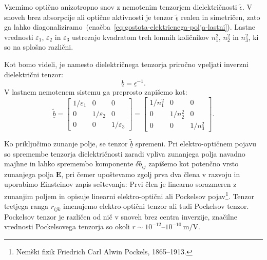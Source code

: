 Vzemimo optično anizotropno snov z nemotenim tenzorjem dielektričnosti  
$\underline{\tilde{\epsilon}}$. V snoveh brez absorpcije ali optične aktivnosti
je tenzor $\underline{\tilde{\epsilon}}$ realen in simetričen, zato ga lahko 
diagonaliziramo~(enačba~\ref{eq:gostota-elektricnega-polja-lastni}). Lastne vrednosti 
$\varepsilon_1$, $\varepsilon_2$ in $\varepsilon_3$ ustrezajo kvadratom treh lomnih
količnikov $n_1^2$, $n_2^2$ in $n_3^2$, ki so na splošno različni.

Kot bomo videli, je namesto dielektričnega tenzorja 
priročno vpeljati inverzni dielektrični tenzor:
\begin{equation}
\underline{b}=\underline{\epsilon}^{-1}.
\end{equation}
V lastnem nemotenem sistemu ga preprosto zapišemo kot:
\begin{equation}
\underline{\tilde{b}} = \left[\begin{array}{ccc}
1/\varepsilon_1 & 0& 0\\
0 & 1/\varepsilon_2& 0\\
0 & 0&  1/\varepsilon_3
\end{array}\right] = 
\left[\begin{array}{ccc}
1/n_1^2 & 0& 0\\
0 & 1/n_2^2& 0\\
0 & 0&  1/n_3^2
\end{array}\right]\!\!.
\end{equation}

Ko priključimo zunanje polje, se tenzor $\underline{\tilde{b}}$
spremeni. Pri elektro-optičnem pojavu so spremembe tenzorja dielektričnosti zaradi vpliva
zunanjega polja navadno majhne in lahko spremembo komponente $\delta b_{ij}$ zapišemo kot 
potenčno vrsto zunanjega polja $\mathbf{E}$, 
pri čemer upoštevamo zgolj prva dva člena v razvoju in uporabimo 
Einsteinov zapis seštevanja:
Prvi člen je linearno sorazmeren z zunanjim poljem in opisuje linearni elektro-optični
ali Pockelsov pojav\footnote{Nemški fizik Friedrich Carl Alwin Pockels, 1865--1913.}. Tenzor tretjega ranga $r_{ijk}$ imenujemo elektro-optični 
tenzor
ali tudi Pockelsov tenzor. 
Pockelsov tenzor je različen od nič v snoveh brez centra inverzije, značilne vrednosti Pockelsovega
tenzorja so okoli $r \sim 10^{-12}$--$10^{-10}~\si{\m/\V}$.


